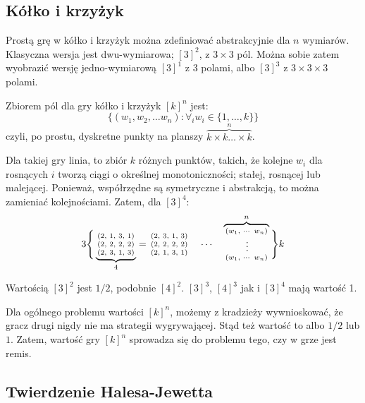 \documentclass{../notatki}
\begin{document}
\subsection{Kółko i krzyżyk}

Prostą grę w kółko i krzyżyk można zdefiniować abstrakcyjnie dla $n$ wymiarów.
Klasyczna wersja jest dwu-wymiarowa; $[3]^2$, z $3 \times 3$ pól. Można sobie
zatem wyobrazić wersję jedno-wymiarową $[3]^1$ z $3$ polami, albo $[3]^3$
z $3 \times 3 \times 3$ polami.

Zbiorem pól dla gry kółko i krzyżyk $[k]^n$ jest:
$$
\{(w_1, w_2, \dots w_n) : \forall_i w_i \in \{1, \dots, k\} \}
$$
czyli, po prostu, dyskretne punkty na planszy $\overbrace{k \times k
\dots \times k}^n$.

Dla takiej gry linia, to zbiór $k$ różnych punktów, takich, że kolejne
$w_i$ dla rosnących $i$ tworzą ciągi o określnej monotoniczności; stałej,
rosnącej lub malejącej. Ponieważ, współrzędne są symetryczne i abstrakcją,
to można zamieniać kolejnościami. Zatem, dla $[3]^4$:
$$
3 \Bigg \{
  \underbrace{
    \begin{smallmatrix}
      (2,& 1,& 3,& 1) \\
      (2,& 2,& 2,& 2) \\
      (2,& 3,& 1,& 3)
    \end{smallmatrix}
  }_4
  =
  \begin{smallmatrix}
    (2,& 3,& 1,& 3) \\
    (2,& 2,& 2,& 2) \\
    (2,& 1,& 3,& 1)
  \end{smallmatrix}
  \quad
  \cdots
  \quad
  \overbrace{
    \begin{smallmatrix}
      (w_1,& \cdots & w_n) \\
      & \vspace{0.2em}\vdots &   \\
      (w_1,& \cdots & w_n)
    \end{smallmatrix}
  }^n
\Bigg \} k
$$

Wartością $[3]^2$ jest $1/2$, podobnie $[4]^2$. $[3]^3$, $[4]^3$ jak i
$[3]^4$ mają wartość 1.

Dla ogólnego problemu wartości $[k]^n$, możemy z kradzieży wywnioskować, że
gracz drugi nigdy nie ma strategii wygrywającej. Stąd też wartość to albo
$1/2$ lub $1$. Zatem, wartość gry $[k]^n$ sprowadza się do problemu tego,
czy w grze jest remis.

\subsection{Twierdzenie Halesa-Jewetta}
\end{document}
